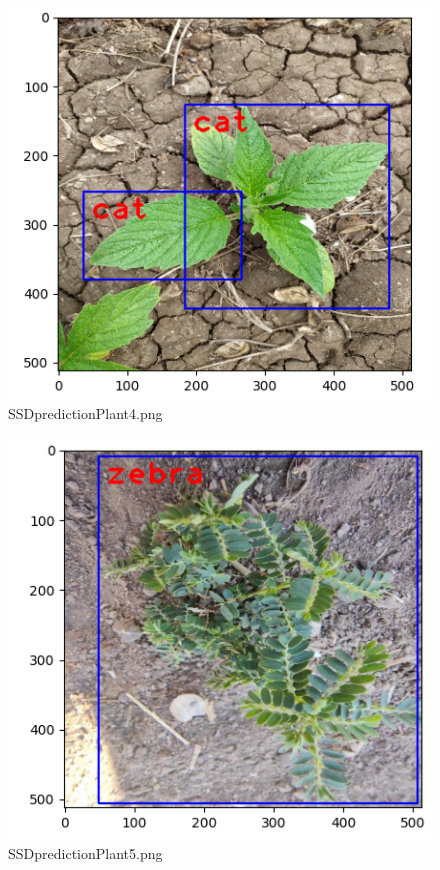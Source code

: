 \documentclass[12pt]{exam}
\begin{document}
\begin{questions}
\begin{parts}
		\hfill

		\begin{figure}[H]
			\includegraphics[width=\textwidth]{images-SSD/plant4.png}
			\caption{SSDpredictionPlant4.png}
		\end{figure}

		\hfill

		\begin{figure}[H]
			\includegraphics[width=\textwidth]{images-SSD/plant5.png}
			\caption{SSDpredictionPlant5.png}
		\end{figure}


\end{parts}
\end{questions}
\end{document}
